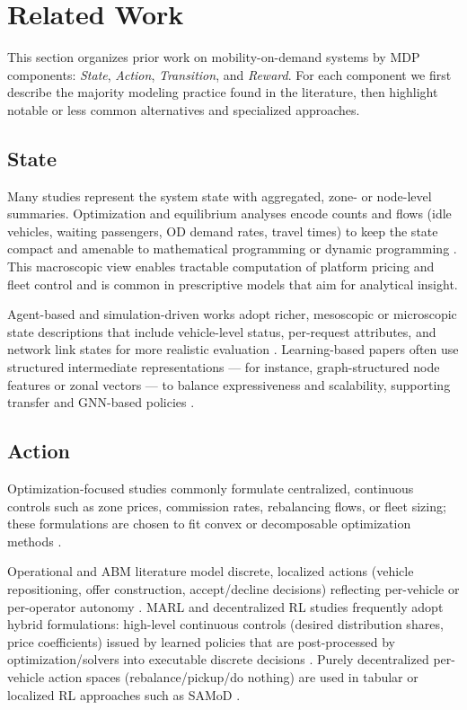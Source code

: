 \section{Related Work}
This section organizes prior work on mobility-on-demand systems by MDP components: \textit{State}, \textit{Action}, \textit{Transition}, and \textit{Reward}. For each component we first describe the majority modeling practice found in the literature, then highlight notable or less common alternatives and specialized approaches.

\subsection{State}
Many studies represent the system state with aggregated, zone- or node-level summaries. Optimization and equilibrium analyses encode counts and flows (idle vehicles, waiting passengers, OD demand rates, travel times) to keep the state compact and amenable to mathematical programming or dynamic programming \citep{spatiotemporal_pricing,spatial_pricing,geometric_matching}. This macroscopic view enables tractable computation of platform pricing and fleet control and is common in prescriptive models that aim for analytical insight.

Agent-based and simulation-driven works adopt richer, mesoscopic or microscopic state descriptions that include vehicle-level status, per-request attributes, and network link states for more realistic evaluation \citep{hybrid_operations,modeling_the_competition,competition_and_cooperation}. Learning-based papers often use structured intermediate representations — for instance, graph-structured node features or zonal vectors — to balance expressiveness and scalability, supporting transfer and GNN-based policies \citep{graph_meta,learning_based,competitive_pricing,two_sided}.

\subsection{Action}
Optimization-focused studies commonly formulate centralized, continuous controls such as zone prices, commission rates, rebalancing flows, or fleet sizing; these formulations are chosen to fit convex or decomposable optimization methods \citep{spatiotemporal_pricing,geometric_matching,spatial_pricing}.

Operational and ABM literature model discrete, localized actions (vehicle repositioning, offer construction, accept/decline decisions) reflecting per-vehicle or per-operator autonomy \citep{competition_and_cooperation,modeling_the_competition,hybrid_operations}. MARL and decentralized RL studies frequently adopt hybrid formulations: high-level continuous controls (desired distribution shares, price coefficients) issued by learned policies that are post-processed by optimization/solvers into executable discrete decisions \citep{learning_based,graph_meta,competitive_pricing}. Purely decentralized per-vehicle action spaces (rebalance/pickup/do nothing) are used in tabular or localized RL approaches such as SAMoD \citep{samod}.

